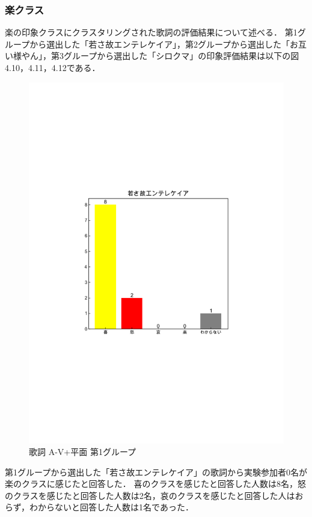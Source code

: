 \subsubsection{楽クラス}
楽の印象クラスにクラスタリングされた歌詞の評価結果について述べる．
第1グループから選出した「若さ故エンテレケイア」，第2グループから選出した「お互い様やん」，第3グループから選出した「シロクマ」の印象評価結果は以下の図4.10，4.11，4.12である．
\begin{figure}[H]
    \centering
    \includegraphics[width=14cm]{4322.pdf}
    \vspace{-1mm}
    \caption{歌詞 A-V+平面 第1グループ}
    \label{fig:mms}
    \vspace{5mm}
\end{figure}
第1グループから選出した「若さ故エンテレケイア」の歌詞から実験参加者0名が楽のクラスに感じたと回答した．
喜のクラスを感じたと回答した人数は8名，怒のクラスを感じたと回答した人数は2名，哀のクラスを感じたと回答した人はおらず，わからないと回答した人数は1名であった．
